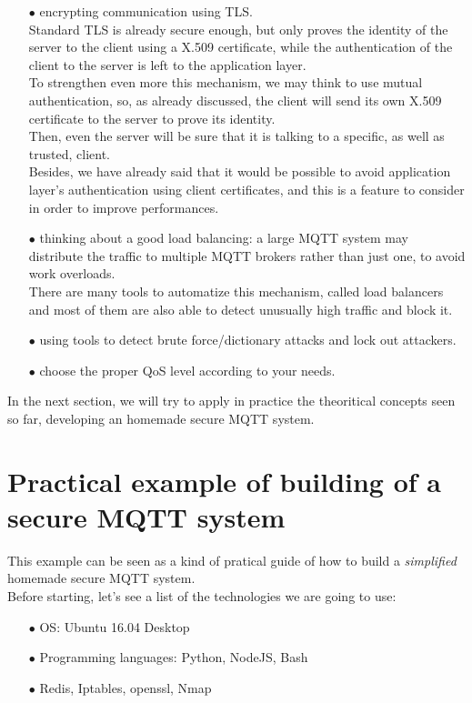\documentclass[12pt]{report}
\begin{document}
{{\begin{itemize}
\item[$\bullet$] encrypting communication using TLS.\\
Standard TLS is already secure enough, but only proves the identity of the server to the client using a X.509 certificate, while the authentication of the client to the server is left to the application layer.\\
To strengthen even more this mechanism, we may think to use mutual authentication, so, as already discussed, the client will send its own X.509 certificate to the server to prove its identity.\\
Then, even the server will be sure that it is talking to a specific, as well as trusted, client.\\
Besides, we have already said that it would be possible to avoid application layer's authentication using client certificates, and this is a feature to consider in order to improve performances.

\item[$\bullet$] thinking about a good load balancing: a large MQTT system may distribute the traffic to multiple MQTT brokers rather than just one, to avoid work overloads.\\
There are many tools to automatize this mechanism, called load balancers and most of them are also able to detect unusually high traffic and block it.
\item[$\bullet$] using tools to detect brute force/dictionary attacks and lock out attackers.
\item[$\bullet$] choose the proper QoS level according to your needs.\\
\end{itemize}

In the next section, we will try to apply in practice the theoritical concepts seen so far, developing an homemade secure MQTT system.\\

\section{Practical example of building of a secure MQTT system}
\bigskip
This example can be seen as a kind of pratical guide of how to build a \emph{simplified} homemade secure MQTT system.\\
Before starting, let's see a list of the technologies we are going to use:
\bigskip
\begin{itemize}
\setlength{\itemindent}{+4mm}
\item[$\bullet$] OS: Ubuntu 16.04 Desktop
\item[$\bullet$] Programming languages: Python, NodeJS, Bash
\item[$\bullet$] Redis, Iptables, openssl, Nmap\\
\end{itemize}

}}
\end{document}
